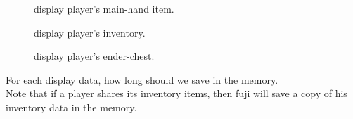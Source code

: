
\begin{description}
    \item [] display player's main-hand item.
    \item[] display player's inventory.
    \item[] display player's ender-chest.
\end{description}

For each display data, how long should we save in the memory.
\\
Note that if a player shares its inventory items, then fuji will save a copy of his inventory data in the memory.